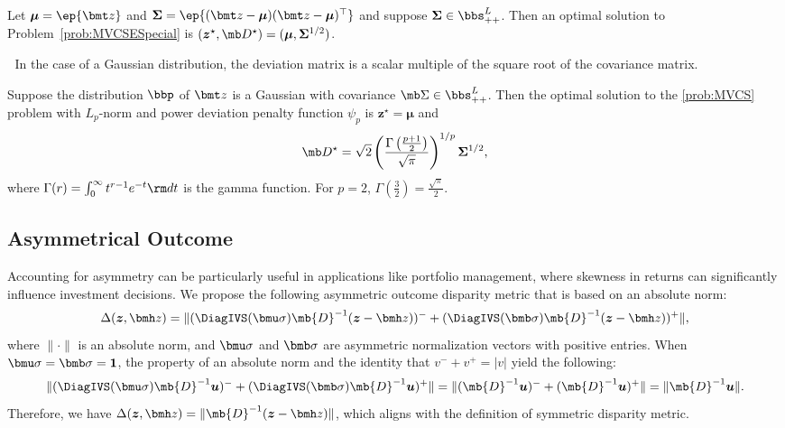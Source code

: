\documentclass[opre, blindrev]{informs4}
\newcommand{\1}[1]{\mathds{1}{\left(#1\right)}}
\begin{document}
\begin{theorem}
\label{chap8:thm:QuadraticMVCSE}
Let $\bm \mu = \ep{\bmt z}$ and $\bm \Sigma = \ep{(\bmt z - \bm \mu)(\bmt z - \bm \mu)^\top}$ and suppose $\bm \Sigma \in \bbs^L_{++}$. Then an optimal solution to Problem~\eqref{prob:MVCSESpecial} is $(\bm z^\star, \mb D^\star) = (\bm \mu, \bm \Sigma^{1/2})$.
\end{theorem}

\medskip
{} $\;$
In the case of a Gaussian distribution, the deviation matrix is a scalar multiple of the square root of the covariance matrix.

\begin{theorem}
\label{chap8:thm:GaussianMVCSE}
Suppose the distribution $\bbp$ of $\bmt z$ is a Gaussian with covariance $\mb \Sigma \in \bbs^L_{++}$. Then the optimal solution to the \ref{prob:MVCS} problem with $L_p$-norm and power deviation penalty function $\psi_p$ is $\bm z^\star = \bm \mu$ and
$$
\mb D^\star = \sqrt{2}\left(\frac{\Gamma \left( \frac{p+1}{2}\right) }{\sqrt{\pi}} \right)^{1/p} \bm \Sigma^{1/2},
$$
where $\Gamma(r) = \int_0^{\infty} t^{r-1} e^{-t} {\rm d}t$ is the gamma function. For $p = 2$, $\Gamma \left( \frac{3}{2} \right) = \frac{\sqrt{\pi}}{2}$.\footnotemark{}
\end{theorem}

\subsection*{Asymmetrical Outcome}

Accounting for asymmetry can be particularly useful in applications like portfolio management, where skewness in returns can significantly influence investment decisions.  We propose the following asymmetric outcome disparity metric that is based on an absolute norm:
\[
\Delta(\bm z,\bmh z) = \|(\DiagIVS(\bmu \sigma) \mb{D}^{-1} (\bm z-\bmh z))^- + (\DiagIVS(\bmb \sigma) \mb{D}^{-1} (\bm z-\bmh z))^+ \|,
\]
where $\|\cdot\|$ is an absolute norm, and \( \bmu \sigma \) and \( \bmb \sigma \) are asymmetric normalization vectors with positive entries. 
When $\bmu \sigma = \bmb \sigma= \bm 1$, the property of an absolute norm and the identity that $v^- + v^+ = |v|$ yield the following:
$$
\|(\DiagIVS(\bmu \sigma) \mb{D}^{-1} \bm u)^- + (\DiagIVS(\bmb \sigma) \mb{D}^{-1} \bm u)^+\| = \| (\mb{D}^{-1} \bm u)^- + (\mb{D}^{-1} \bm u)^+\| = \| \mb{D}^{-1} \bm u\|. 
$$
Therefore, we have $\Delta(\bm z,\bmh z) = \|\mb{D}^{-1}(\bm z-\bmh z)\|$, which aligns with the definition of symmetric disparity metric.
\end{document}
